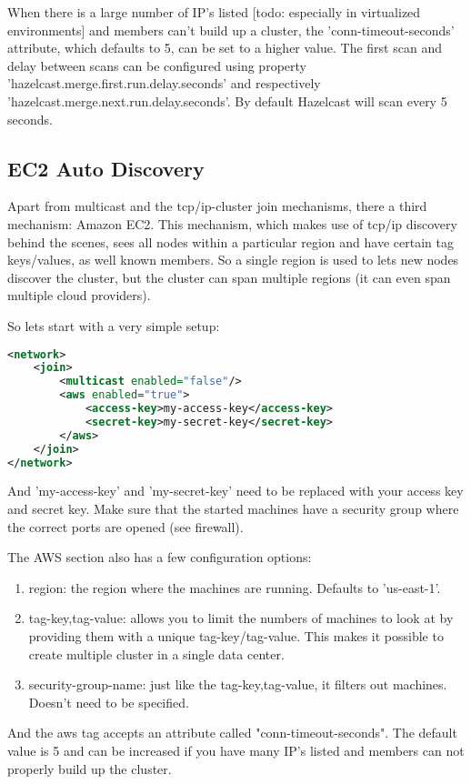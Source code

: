 When there is a large number of IP's listed [todo: especially in virtualized environments] and members can't build up a cluster, the 'conn-timeout-seconds' attribute, which defaults to 5, can be set to a higher value. The first scan and delay between scans can be configured using property 'hazelcast.merge.first.run.delay.seconds' and respectively 'hazelcast.merge.next.run.delay.seconds'. By default Hazelcast will scan every 5 seconds.

\subsection{EC2 Auto Discovery}
Apart from multicast and the tcp/ip-cluster join mechanisms, there a third mechanism: Amazon EC2. This mechanism, which makes use of tcp/ip discovery behind the scenes, sees all nodes within a particular region and have certain tag keys/values, as well known members. So a single region is used to lets new nodes discover the cluster, but the cluster can span multiple regions (it can even span multiple cloud providers).

So lets start with a very simple setup:
\begin{lstlisting}[language=xml]
<network>
    <join>
        <multicast enabled="false"/>
        <aws enabled="true">
            <access-key>my-access-key</access-key>
            <secret-key>my-secret-key</secret-key>
        </aws>
    </join>
</network>
\end{lstlisting}
And 'my-access-key' and 'my-secret-key' need to be replaced with your access key and secret key. Make sure that the started machines have a security group where the correct ports are opened (see firewall).

The AWS section also has a few configuration options:
\begin{enumerate}
\item region: the region where the machines are running. Defaults to 'us-east-1'.
\item tag-key,tag-value: allows you to limit the numbers of machines to look at by providing them with a unique tag-key/tag-value. This makes it possible to create multiple cluster in a single data center.
\item security-group-name: just like the tag-key,tag-value, it filters out machines. Doesn't need to be specified.
\end{enumerate}
And the aws tag accepts an attribute called "conn-timeout-seconds". The default value is 5 and can be increased  if you have many IP's listed and members can not properly build up the cluster.

